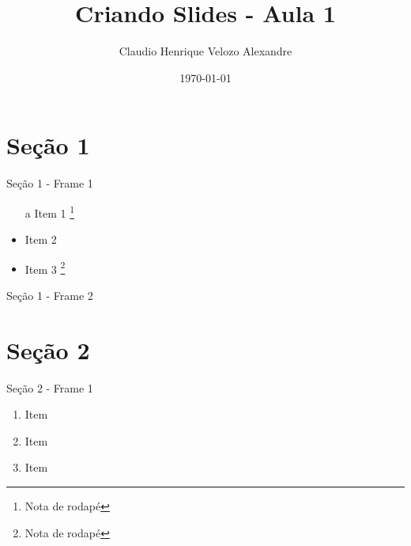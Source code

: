 \documentclass[]{beamer}
\title{Criando Slides - Aula 1}
\author[Claudio Henrique]{Claudio Henrique Velozo Alexandre}
\institute{Universidade Federal do Maranhão}
\date{\today}
\begin{document}
\frame{\maketitle} 






\section{Seção 1}
	\begin{frame}{Seção 1 - Frame 1}
		\begin{itemize}
			\item[a] Item 1 \footnote{Nota de rodapé}
			\item Item 2
			\item Item 3 \footnote[9]{Nota de rodapé}
		\end{itemize}
	\end{frame}
	
	\begin{frame}{Seção 1 - Frame 2}
		\lipsum[1-1]
	\end{frame}

\section{Seção 2}

	\begin{frame}{Seção 2 - Frame 1}
		\begin{enumerate} [<+- | alert@+>] %
			\item Item
			\item Item
			\item Item
		\end{enumerate}
	\end{frame}
	
\end{document}
